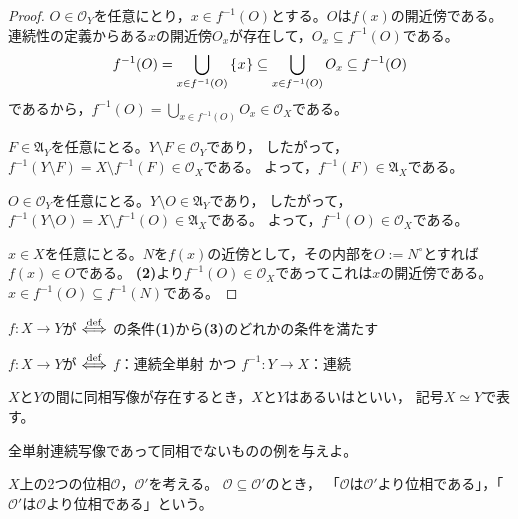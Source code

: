 \documentclass[uplatex]{jsarticle}
\begin{document}
\begin{proof}
   $O \in \mathcal{O}_{Y}$を任意にとり，$x \in f^{-1}(O)$とする。$O$は$f(x)$の開近傍である。
  連続性の定義からある$x$の開近傍$O_{x}$が存在して，$O_{x} \subseteq f^{-1} (O)$である。
  \begin{equation}
    f^{-1} (O) = \bigcup_{x \in f^{-1}(O)} \Set{\hspace{-1.8pt} x \hspace{-1.8pt}} \subseteq \bigcup_{x \in f^{-1}(O)} O_{x} \subseteq f^{-1}(O)
  \end{equation}
  であるから，${\displaystyle f^{-1}(O) = \bigcup_{x \in f^{-1} (O)} O_{x} \in \mathcal{O}_{X}}$である。

   $F \in \mathfrak{A}_{Y}$を任意にとる。$Y \setminus F \in \mathcal{O}_{Y}$であり，
  したがって，$f^{-1} (Y \setminus F) = X \setminus f^{-1}(F) \in \mathcal{O}_{X}$である。
  よって，$f^{-1} (F) \in \mathfrak{A}_{X}$である。

   $O \in \mathcal{O}_{Y}$を任意にとる。$Y \setminus O \in \mathfrak{A}_{Y}$であり，
  したがって，$f^{-1} (Y \setminus O) = X \setminus f^{-1} (O) \in \mathfrak{A}_{X}$である。
  よって，$f^{-1} (O) \in \mathcal{O}_{X}$である。

   $x \in X$を任意にとる。$N$を$f(x)$の近傍として，その内部を$O := N^{\circ}$とすれば$f(x) \in O$である。
  {\bf (2)}より$f^{-1}(O) \in \mathcal{O}_{X}$であってこれは$x$の開近傍である。
  $x \in f^{-1} (O) \subseteq f^{-1} (N)$である。
\end{proof}

\begin{teigi}[連続・同相]
   $f \colon X \longrightarrow Y$が $\overset{\mathrm{def}}{\Longleftrightarrow}$ の条件{\bf (1)}から{\bf (3)}のどれかの条件を満たす
  
   $f \colon X \longrightarrow Y$が $\overset{\mathrm{def}}{\Longleftrightarrow}$ $f$：連続全単射 かつ $f^{-1} \colon Y \longrightarrow X$：連続
  
  $X$と$Y$の間に同相写像が存在するとき，$X$と$Y$はあるいはといい，
  記号$X \simeq Y$で表す。
\end{teigi}

 全単射連続写像であって同相でないものの例を与えよ。

\begin{teigi}[位相の強弱]
  $X$上の2つの位相$\mathcal{O}$，$\mathcal{O}'$を考える。
  $\mathcal{O} \subseteq \mathcal{O}'$のとき，
  「$\mathcal{O}$は$\mathcal{O}'$より位相である」，「$\mathcal{O}'$は$\mathcal{O}$より位相である」という。
\end{teigi}
\end{document}

